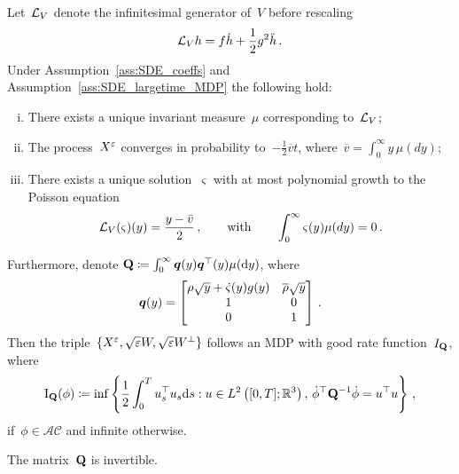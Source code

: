 \begin{theorem}\label{thm:limitPoisson}
Let~$\mathcal{L}_{V}$ denote the infinitesimal generator of~$V$ before rescaling
\[
\mathcal{L}_V h = f\dot{h} + \frac{1}{2}g^2\ddot{h}\,.
\]
Under Assumption~\ref{ass:SDE_coeffs} and Assumption~\ref{ass:SDE_largetime_MDP} the following hold:
\begin{enumerate}[i)]
    \item There exists a unique invariant measure~$\mu$ corresponding to~$\mathcal{L}_V$;
    \item The process~$X^{\varepsilon}$ converges in probability to~$-\frac{1}{2}\overline{v}t$, where~$\overline{v} = \int_0^\infty y \, \mu(dy)$;
    \item There exists a unique solution~$\varsigma$ with at most polynomial growth to the Poisson equation
    \[
    \mathcal{L}_V(\varsigma)(y) = \frac{y - \bar{v}}{2}\,, 
    \qquad \text{with} \qquad \int_0^\infty \varsigma(y)\mu(dy)=0\,.
    \]
\end{enumerate}
Furthermore, denote 
$\boldsymbol{\mathrm{Q}}\coloneqq\int_0^\infty\boldsymbol{q}(y)\boldsymbol{q}^\top(y)\mu(\mathrm{d} y)$, where
$$
\boldsymbol{q}(y) =
\begin{bmatrix}
\rho\sqrt{y} + \dot{\varsigma}(y)g(y) & \overline{\rho}\sqrt{y}\\
1 & 0 \\
0 & 1 \\
\end{bmatrix}\,.
$$
Then the triple~$\{X^{\varepsilon},\sqrt{\varepsilon}W,\sqrt{\varepsilon}W^{\perp}\}$ follows an MDP with good rate function~$I_{\boldsymbol{\mathrm{Q}}}$,
where
$$
\mathrm{I}_{\boldsymbol{\mathrm{Q}}}(\phi) \coloneqq 
\inf \left\{\frac{1}{2}\int_0^T u_s^\top u_s\mathrm{d} s: u\in L^2\left([0,T]; \mathbb{R}^3\right), \, \dot{\phi}^\top \boldsymbol{\mathrm{Q}}^{-1} \dot{\phi} = u^\top u \right\}\,,
$$
if~$\phi\in\mathcal{AC}$ and infinite otherwise.
\end{theorem}
\begin{lemma}\label{q-invertible}
The matrix~$\boldsymbol{\mathrm{Q}}$ is invertible. 
\end{lemma}
